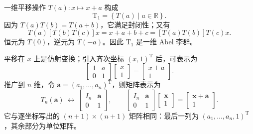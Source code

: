 \begin{example}[连续平移群]
一维平移操作 $T\left(a\right):x\mapsto x+a$ 构成
\begin{equation}
\mathrm{T}_1=\left\{T\left(a\right)\mid a\in\mathbb{R}\right\}.
\end{equation}
因为 $T\left(a\right)T\left(b\right)=T\left(a+b\right)$，它满足封闭性；又有
\begin{equation}
T\left(a\right)\left[T\left(b\right)T\left(c\right)\right]x=x+a+b+c=\left[T\left(a\right)T\left(b\right)\right]T\left(c\right)x.
\end{equation}
恒元为 $T\left(0\right)$，逆元为 $T\left(-a\right)$。因此 $\mathrm{T}_1$ 是一维 Abel 李群。

平移在 $x$ 上是仿射变换；引入齐次坐标 $\left(x,1\right)^{\mathrm{T}}$ 后，可表示为
\begin{equation}
\begin{bmatrix}1&a\\0&1\end{bmatrix}
\begin{bmatrix}x\\1\end{bmatrix}
=\begin{bmatrix}x+a\\1\end{bmatrix}.
\end{equation}
推广到 $n$ 维，令 $\bm{a}=\left(a_1,\ldots,a_n\right)^{\mathrm{T}}$，则矩阵表示为
\begin{equation}
T_n\left(\bm{a}\right)\ \longleftrightarrow\
\begin{bmatrix}I_n&\bm{a}\\0&1\end{bmatrix},\qquad
\begin{bmatrix}I_n&\bm{a}\\0&1\end{bmatrix}
\begin{bmatrix}\bm{x}\\1\end{bmatrix}
=\begin{bmatrix}\bm{x}+\bm{a}\\1\end{bmatrix}.
\end{equation}
它与逐坐标写出的 $\left(n+1\right)\times\left(n+1\right)$ 矩阵相同：最后一列为
$\left(a_1,\ldots,a_n,1\right)^{\mathrm{T}}$，其余部分为单位矩阵。
\end{example}

